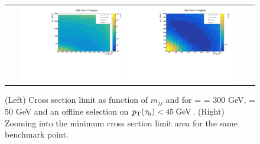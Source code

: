 \begin{figure}[tbh!]
	\centering
	\begin{tabular}{cc}
		\includegraphics[width=0.45\textwidth]{analysis/pics/JetInvMass_vs_MET_xsec_chi300_lsp050_taupt45.pdf}
		\includegraphics[width=0.45\textwidth]{analysis/pics/JetInvMass_vs_MET_xsec_chi300_lsp050_taupt45_zoom.pdf}
	\end{tabular}
	\caption{(Left) Cross section limit as function of $m_{jj}$ and \met for \charginopm = \neutralinotwo = 300 GeV, \neutralinoone = 50 GeV and an offline selection on $p_{\text{T}}(\tau_{\text{h}}) <  45\;\text{Ge}\kern-0.06667em\text{V}$. (Right) Zooming into the minimum cross section limit area for the same benchmark point.}
	\label{fig::JetInvMass_vs_MET_xsec_chi300_lsp050_taupt45}
\end{figure}

\FloatBarrier
